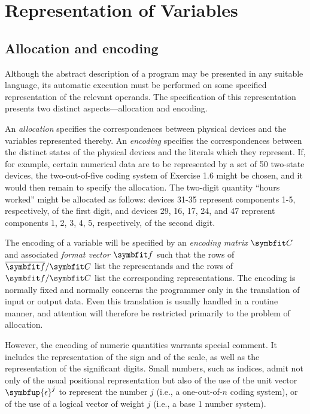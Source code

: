 ﻿
\chapter{Representation of Variables}

\section{Allocation and encoding}

\par Although the abstract description of a program may be presented in any suitable language, its automatic execution must be performed on some specified representation of the relevant operands. The specification of this representation presents two distinct aspects---allocation and encoding.

\par An \textit{allocation} specifies the correspondences between physical devices and the variables represented thereby. An \textit{encoding} specifies the correspondences between the distinct states of the physical devices and the literals which they represent. If, for example, certain numerical data are to be represented by a set of 50 two-state devices, the two-out-of-five coding system of Exercise 1.6 might be chosen, and it would then remain to specify the allocation. The two-digit quantity ``hours worked'' might be allocated as follows: devices 31-35 represent components 1-5, respectively, of the first digit, and devices 29, 16, 17, 24, and 47 represent components 1, 2, 3, 4, 5, respectively, of the second digit.

\par The encoding of a variable will be specified by an \textit{encoding matrix} $\mat{C}$ and associated \textit{format vector} $\vect{f}$ such that the rows of $\overline{\vect{f}}/\mat{C}$ list the representands and the rows of $\vect{f}/\mat{C}$ list the corresponding representations. The encoding is normally fixed and normally concerns the programmer only in the translation of input or output data. Even this translation is usually handled in a routine manner, and attention will therefore be restricted primarily to the problem of allocation.

\par However, the encoding of numeric quantities warrants special comment. It includes the representation of the sign and of the scale, as well as the representation of the significant digits. Small numbers, such as indices, admit not only of the usual positional representation but also of the use of the unit vector $\symbfup{\epsilon}^j$ to represent the number $j$ (i.e., a one-out-of-$n$ coding system), or of the use of a logical vector of weight $j$ (i.e., a base 1 number system).

